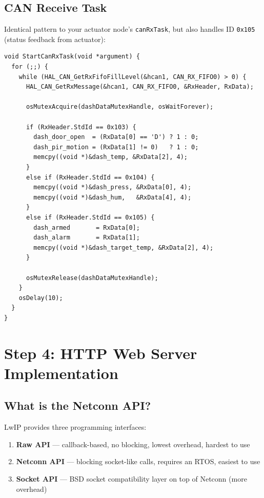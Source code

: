 \documentclass[11pt,a4paper]{article}
\begin{document}
\subsection{CAN Receive Task}
Identical pattern to your actuator node's \texttt{canRxTask}, but also handles ID \texttt{0x105} (status feedback from actuator):

\begin{lstlisting}
void StartCanRxTask(void *argument) {
  for (;;) {
    while (HAL_CAN_GetRxFifoFillLevel(&hcan1, CAN_RX_FIFO0) > 0) {
      HAL_CAN_GetRxMessage(&hcan1, CAN_RX_FIFO0, &RxHeader, RxData);

      osMutexAcquire(dashDataMutexHandle, osWaitForever);

      if (RxHeader.StdId == 0x103) {
        dash_door_open  = (RxData[0] == 'D') ? 1 : 0;
        dash_pir_motion = (RxData[1] != 0)   ? 1 : 0;
        memcpy((void *)&dash_temp, &RxData[2], 4);
      }
      else if (RxHeader.StdId == 0x104) {
        memcpy((void *)&dash_press, &RxData[0], 4);
        memcpy((void *)&dash_hum,   &RxData[4], 4);
      }
      else if (RxHeader.StdId == 0x105) {
        dash_armed       = RxData[0];
        dash_alarm       = RxData[1];
        memcpy((void *)&dash_target_temp, &RxData[2], 4);
      }

      osMutexRelease(dashDataMutexHandle);
    }
    osDelay(10);
  }
}
\end{lstlisting}

\newpage

\section{Step 4: HTTP Web Server Implementation}

\subsection{What is the Netconn API?}
LwIP provides three programming interfaces:
\begin{enumerate}[leftmargin=2em]
  \item \textbf{Raw API} --- callback-based, no blocking, lowest overhead, hardest to use
  \item \textbf{Netconn API} --- blocking socket-like calls, requires an RTOS, easiest to use
  \item \textbf{Socket API} --- BSD socket compatibility layer on top of Netconn (more overhead)
\end{enumerate}
\end{document}
